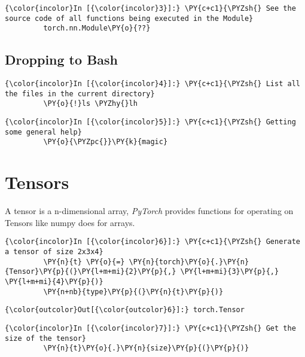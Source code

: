     \begin{Verbatim}[commandchars=\\\{\}]
{\color{incolor}In [{\color{incolor}3}]:} \PY{c+c1}{\PYZsh{} See the source code of all functions being executed in the Module}
         torch.nn.Module\PY{o}{??}
\end{Verbatim}
        
\subsection{Dropping to Bash}
\begin{Verbatim}[commandchars=\\\{\}]
{\color{incolor}In [{\color{incolor}4}]:} \PY{c+c1}{\PYZsh{} List all the files in the current directory}
         \PY{o}{!}ls \PYZhy{}lh 
\end{Verbatim}

\begin{Verbatim}[commandchars=\\\{\}]
{\color{incolor}In [{\color{incolor}5}]:} \PY{c+c1}{\PYZsh{} Getting some general help}
         \PY{o}{\PYZpc{}}\PY{k}{magic} 
\end{Verbatim}

\section{Tensors}\label{tensors}   
A tensor is a n-dimensional array, \emph{PyTorch} provides functions for operating on Tensors like numpy does for arrays.
\begin{Verbatim}[commandchars=\\\{\}]
{\color{incolor}In [{\color{incolor}6}]:} \PY{c+c1}{\PYZsh{} Generate a tensor of size 2x3x4}
         \PY{n}{t} \PY{o}{=} \PY{n}{torch}\PY{o}{.}\PY{n}{Tensor}\PY{p}{(}\PY{l+m+mi}{2}\PY{p}{,} \PY{l+m+mi}{3}\PY{p}{,} \PY{l+m+mi}{4}\PY{p}{)}
         \PY{n+nb}{type}\PY{p}{(}\PY{n}{t}\PY{p}{)} 
\end{Verbatim}


\begin{Verbatim}[commandchars=\\\{\}]
{\color{outcolor}Out[{\color{outcolor}6}]:} torch.Tensor
\end{Verbatim}
            
\begin{Verbatim}[commandchars=\\\{\}]
{\color{incolor}In [{\color{incolor}7}]:} \PY{c+c1}{\PYZsh{} Get the size of the tensor}
         \PY{n}{t}\PY{o}{.}\PY{n}{size}\PY{p}{(}\PY{p}{)} 
\end{Verbatim}



